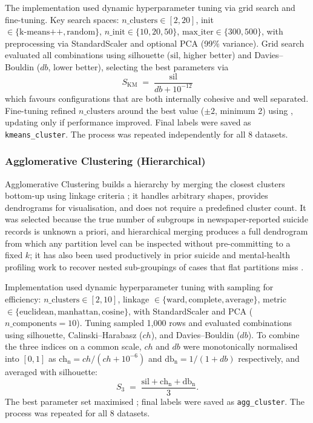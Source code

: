 The implementation used dynamic hyperparameter tuning via grid search and fine-tuning. Key search spaces: $n\_\mathrm{clusters} \in [2, 20]$, init $\in \{\text{k-means++}, \text{random}\}$, $n\_\mathrm{init} \in \{10, 20, 50\}$, $\mathrm{max\_iter} \in \{300, 500\}$, with preprocessing via StandardScaler and optional PCA (99\% variance). Grid search evaluated all combinations using silhouette ($\text{sil}$, higher better) and Davies--Bouldin ($db$, lower better), selecting the best parameters via
\begin{equation}\label{eq:tuning_score_kmeans}
S_{\mathrm{KM}} \;=\; \frac{\text{sil}}{db + 10^{-12}}
\end{equation}
which favours configurations that are both internally cohesive and well separated. Fine-tuning refined $n\_\mathrm{clusters}$ around the best value ($\pm 2$, minimum 2) using , updating only if performance improved. Final labels were saved as \texttt{kmeans\_cluster}. The process was repeated independently for all 8 datasets.

\subsubsection{Agglomerative Clustering (Hierarchical)}

Agglomerative Clustering builds a hierarchy by merging the closest clusters bottom-up using linkage criteria \cite{ref14}; it handles arbitrary shapes, provides dendrograms for visualisation, and does not require a predefined cluster count. It was selected because the true number of subgroups in newspaper-reported suicide records is unknown a priori, and hierarchical merging produces a full dendrogram from which any partition level can be inspected without pre-committing to a fixed $k$; it has also been used productively in prior suicide and mental-health profiling work to recover nested sub-groupings of cases that flat partitions miss \cite{ref34, ref36}.

Implementation used dynamic hyperparameter tuning with sampling for efficiency: $n\_\mathrm{clusters} \in [2, 10]$, linkage $\in \{\text{ward}, \text{complete}, \text{average}\}$, metric $\in \{\text{euclidean}, \text{manhattan}, \text{cosine}\}$, with StandardScaler and PCA ($n\_\mathrm{components}=10$). Tuning sampled 1{,}000 rows and evaluated combinations using silhouette, Calinski--Harabasz ($ch$), and Davies--Bouldin ($db$). To combine the three indices on a common scale, $ch$ and $db$ were monotonically normalised into $[0, 1]$ as $\text{ch}_{\mathrm{n}} = ch/(ch + 10^{-6})$ and $\text{db}_{\mathrm{n}} = 1/(1 + db)$ respectively, and averaged with silhouette:
\begin{equation}\label{eq:tuning_score_three_metric}
S_{3} \;=\; \frac{\text{sil} + \text{ch}_{\mathrm{n}} + \text{db}_{\mathrm{n}}}{3}.
\end{equation}
The best parameter set maximised ; final labels were saved as \texttt{agg\_cluster}. The process was repeated for all 8 datasets.

